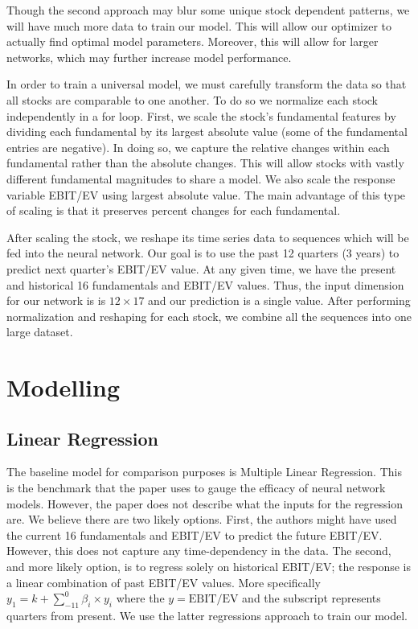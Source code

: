 \documentclass[11pt, letterpaper, headings=standardclasses]{scrartcl}
\begin{document}
    Though the second approach may blur some unique stock dependent patterns, we will have much more data to train our model. This will allow our optimizer to actually find optimal model parameters. Moreover, this will allow for larger networks, which may further increase model performance.

    In order to train a universal model, we must carefully transform the data so that all stocks are comparable to one another. To do so we normalize each stock independently in a for loop. First, we scale the stock's fundamental features by dividing each fundamental by its largest absolute value (some of the fundamental entries are negative). In doing so, we capture the relative changes within each fundamental rather than the absolute changes. This will allow stocks with vastly different fundamental magnitudes to share a model. We also scale the response variable EBIT/EV using largest absolute value. The main advantage of this type of scaling is that it preserves percent changes for each fundamental. 

    After scaling the stock, we reshape its time series data to sequences which will be fed into the neural network. Our goal is to use the past 12 quarters (3 years) to predict next quarter's EBIT/EV value. At any given time, we have the present and historical 16 fundamentals and EBIT/EV values. Thus, the input dimension for our network is is $12\times17$ and our prediction is a single value. After performing normalization and reshaping for each stock, we combine all the sequences into one large dataset.
    
	\section{Modelling}
	\subsection{Linear Regression}
	The baseline model for comparison purposes is Multiple Linear Regression. This is the benchmark that the paper uses to gauge the efficacy of neural network models. However, the paper does not describe what the inputs for the regression are. We believe there are two likely options. First, the authors might have used the current 16 fundamentals and EBIT/EV to predict the future EBIT/EV. However, this does not capture any time-dependency in the data. The second, and more likely option, is to regress solely on historical EBIT/EV; the response is a linear combination of past EBIT/EV values. More specifically $y_1 = k + \sum^{0}_{-11} \beta_i \times y_i$ where the $y=\text{EBIT/EV}$ and the subscript represents quarters from present. We use the latter regressions approach to train our model.
	
\end{document}
